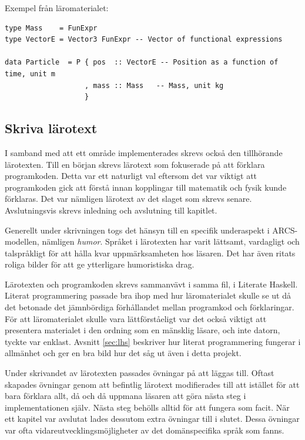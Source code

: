 \begin{draft}
Exempel från läromaterialet:
\begin{lstlisting}[frame=none, belowskip=-0.5\baselineskip, xleftmargin=0.5in]
type Mass    = FunExpr
type VectorE = Vector3 FunExpr -- Vector of functional expressions

data Particle  = P { pos  :: VectorE -- Position as a function of time, unit m
                   , mass :: Mass   -- Mass, unit kg
                   }
\end{lstlisting}

\subsection{Skriva lärotext}

I samband med att ett område implementerades skrevs också den tillhörande
lärotexten. Till en början skrevs lärotext som fokuserade på att förklara
programkoden. Detta var ett naturligt val eftersom det var viktigt att
programkoden gick att förstå innan kopplingar till matematik och fysik kunde
förklaras. Det var nämligen lärotext av det slaget som skrevs senare.
Avslutningsvis skrevs inledning och avslutning till kapitlet.

Generellt under skrivningen togs det hänsyn till en specifik underaspekt i ARCS-modellen, nämligen \textit{humor}. Språket i lärotexten har varit lättsamt, vardagligt och talspråkligt för att hålla kvar uppmärksamheten hos läsaren. Det har även ritats roliga bilder för att ge ytterligare humoristiska drag.

Lärotexten och programkoden skrevs sammanvävt i samma fil, i Literate
Haskell. Literat programmering passade bra ihop med
hur läromaterialet skulle se ut då det betonade det jämnbördiga förhållandet
mellan programkod och förklaringar. För att läromaterialet skulle vara
lättförståeligt var det också viktigt att presentera materialet i den ordning
som en mänsklig läsare, och inte datorn, tyckte var enklast. Avsnitt \ref{sec:lhs} beskriver hur literat programmering fungerar i allmänhet och ger
en bra bild hur det såg ut även i detta projekt.

Under skrivandet av lärotexten passades övningar på att läggas till. Oftast
skapades övningar genom att befintlig lärotext modifierades till att istället
för att bara förklara allt, då och då uppmana läsaren att göra nästa steg i
implementationen själv. Nästa steg behölls alltid för att fungera som facit. När
ett kapitel var avslutat lades dessutom extra övningar till i slutet. Dessa
övningar var ofta vidareutvecklingsmöjligheter av det domänspecifika språk som
fanns.


\end{draft}
